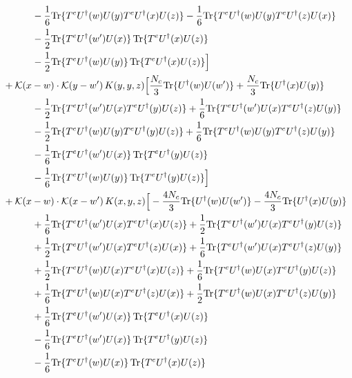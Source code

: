 \documentclass[10pt]{article}
\numberwithin{equation}{section}
\begin{document}
\begin{align}
&\quad\quad\quad-\frac{1}{6}{\rm Tr}\{T^eU^\dagger(w)U(y)T^eU^\dagger(x)U(z)\}-\frac{1}{6}{\rm Tr}\{T^eU^\dagger(w)U(y)T^eU^\dagger(z)U(x)\}\notag\\
&\quad\quad\quad-\frac{1}{2}{\rm Tr}\{T^eU^\dagger(w')U(x)\}\,{\rm Tr}\{T^eU^\dagger(x)U(z)\}\notag\\
&\quad\quad\quad-\frac{1}{2}{\rm Tr}\{T^eU^\dagger(w)U(y)\}\,{\rm Tr}\{T^eU^\dagger(x)U(z)\}\Big]\notag\\
&+\mathcal K(x-w)\cdot\mathcal K(y-w')\,K(y,y,z)\Big[\frac{N_c}{3}{\rm Tr}\{U^\dagger(w)U(w')\}+\frac{N_c}{3}{\rm Tr}\{U^\dagger(x)U(y)\}\notag\\
&\quad\quad\quad-\frac{1}{2}{\rm Tr}\{T^eU^\dagger(w')U(x)T^eU^\dagger(y)U(z)\}+\frac{1}{6}{\rm Tr}\{T^eU^\dagger(w')U(x)T^eU^\dagger(z)U(y)\}\notag\\
&\quad\quad\quad-\frac{1}{2}{\rm Tr}\{T^eU^\dagger(w)U(y)T^eU^\dagger(y)U(z)\}+\frac{1}{6}{\rm Tr}\{T^eU^\dagger(w)U(y)T^eU^\dagger(z)U(y)\}\notag\\
&\quad\quad\quad-\frac{1}{6}{\rm Tr}\{T^eU^\dagger(w')U(x)\}\,{\rm Tr}\{T^eU^\dagger(y)U(z)\}\notag\\
&\quad\quad\quad-\frac{1}{6}{\rm Tr}\{T^eU^\dagger(w)U(y)\}\,{\rm Tr}\{T^eU^\dagger(y)U(z)\}\Big]\notag\\
&+\mathcal K(x-w)\cdot\mathcal K(x-w')\,K(x,y,z)\Big[-\frac{4 N_c}{3}{\rm Tr}\{U^\dagger(w)U(w')\}-\frac{4 N_c}{3}{\rm Tr}\{U^\dagger(x)U(y)\}\notag\\
&\quad\quad\quad+\frac{1}{6}{\rm Tr}\{T^eU^\dagger(w')U(x)T^eU^\dagger(x)U(z)\}+\frac{1}{2}{\rm Tr}\{T^eU^\dagger(w')U(x)T^eU^\dagger(y)U(z)\}\notag\\
&\quad\quad\quad+\frac{1}{2}{\rm Tr}\{T^eU^\dagger(w')U(x)T^eU^\dagger(z)U(x)\}+\frac{1}{6}{\rm Tr}\{T^eU^\dagger(w')U(x)T^eU^\dagger(z)U(y)\}\notag\\
&\quad\quad\quad+\frac{1}{2}{\rm Tr}\{T^eU^\dagger(w)U(x)T^eU^\dagger(x)U(z)\}+\frac{1}{6}{\rm Tr}\{T^eU^\dagger(w)U(x)T^eU^\dagger(y)U(z)\}\notag\\
&\quad\quad\quad+\frac{1}{6}{\rm Tr}\{T^eU^\dagger(w)U(x)T^eU^\dagger(z)U(x)\}+\frac{1}{2}{\rm Tr}\{T^eU^\dagger(w)U(x)T^eU^\dagger(z)U(y)\}\notag\\
&\quad\quad\quad+\frac{1}{6}{\rm Tr}\{T^eU^\dagger(w')U(x)\}\,{\rm Tr}\{T^eU^\dagger(x)U(z)\}\notag\\
&\quad\quad\quad-\frac{1}{6}{\rm Tr}\{T^eU^\dagger(w')U(x)\}\,{\rm Tr}\{T^eU^\dagger(y)U(z)\}\notag\\
&\quad\quad\quad-\frac{1}{6}{\rm Tr}\{T^eU^\dagger(w)U(x)\}\,{\rm Tr}\{T^eU^\dagger(x)U(z)\}\notag\\

\end{align}
\end{document}
